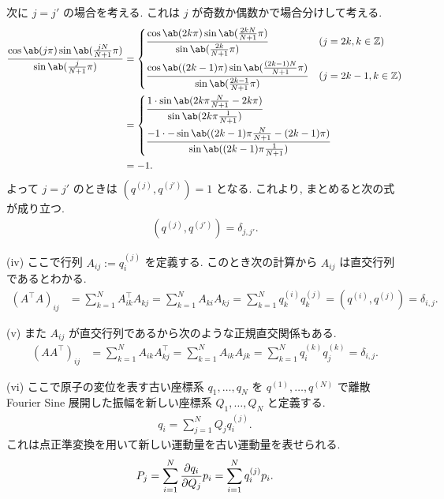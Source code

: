 \documentclass[uplatex,dvipdfmx,a4paper,11pt]{jlreq}
\newcommand{\ZZ}{\mathbb{Z}}
\numberwithin{equation}{section}
\theoremstyle{definition}
\begin{document}
次に $j = j'$ の場合を考える. これは $j$ が奇数か偶数かで場合分けして考える.
\begin{align}
  \frac{\cos\ab(j\pi)\sin\ab(\frac{jN}{N+1}\pi)}{\sin\ab(\frac{j}{N+1}\pi)} & =
  \begin{dcases}
    \frac{\cos\ab(2k\pi)\sin\ab(\frac{2kN}{N+1}\pi)}{\sin\ab(\frac{2k}{N+1}\pi)}           & (j = 2k, k\in\ZZ)   \\
    \frac{\cos\ab((2k-1)\pi)\sin\ab(\frac{(2k-1)N}{N+1}\pi)}{\sin\ab(\frac{2k-1}{N+1}\pi)} & (j = 2k-1, k\in\ZZ)
  \end{dcases} \\ & =
  \begin{dcases}
    \frac{1\cdot\sin\ab(2k\pi\frac{N}{N+1} - 2k\pi)}{\sin\ab(2k\pi\frac{1}{N+1})} \\
    \frac{-1 \cdot -\sin\ab((2k-1)\pi\frac{N}{N+1} - (2k-1)\pi)}{\sin\ab((2k-1)\pi\frac{1}{N+1})}
  \end{dcases}           \\
                                                                            & = -1.
\end{align}
よって $j = j'$ のときは $(q^{(j)}, q^{(j')}) = 1$ となる. これより, まとめると次の式が成り立つ.
\begin{align}
  (q^{(j)}, q^{(j')}) = \delta_{j,j'}.
\end{align}


(iv) ここで行列 $A_{ij} := q_i^{(j)}$ を定義する. このとき次の計算から $A_{ij}$ は直交行列であるとわかる.
\begin{align}
  (A^{\top}A)_{ij} & = \sum_{k=1}^{N}A_{ik}^\top A_{kj} = \sum_{k=1}^{N}A_{ki}A_{kj} = \sum_{k=1}^{N}q_k^{(i)}q_k^{(j)} = (q^{(i)}, q^{(j)}) = \delta_{i,j}.
\end{align}

(v) また $A_{ij}$ が直交行列であるから次のような正規直交関係もある.
\begin{align}
  (AA^{\top})_{ij} & = \sum_{k=1}^{N}A_{ik}A_{kj}^{\top} = \sum_{k=1}^{N}A_{ik}A_{jk} = \sum_{k=1}^{N}q_i^{(k)}q_j^{(k)} = \delta_{i,j}.
\end{align}

(vi) ここで原子の変位を表す古い座標系 $q_1, \ldots, q_N$ を $q^{(1)}, \ldots, q^{(N)}$ で離散 Fourier Sine 展開した振幅を新しい座標系 $Q_1, \ldots, Q_N$ と定義する.
\begin{align}
  q_i = \sum_{j=1}^{N}Q_jq_i^{(j)}.
\end{align}
これは点正準変換を用いて新しい運動量を古い運動量を表せられる.
\begin{align}
  P_j = \sum_{i=1}^{N}\diffp{q_i}{Q_j}p_i = \sum_{i=1}^{N}q_i^{(j)}p_i.
\end{align}
\end{document}
